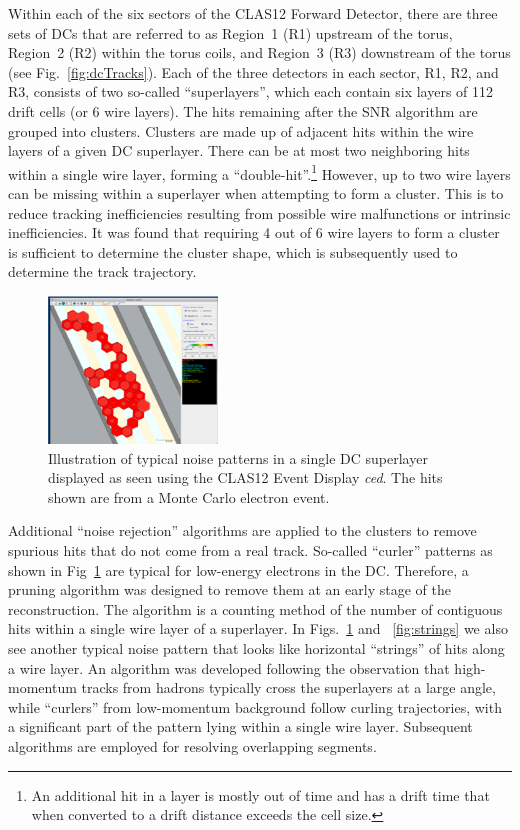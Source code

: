 Within each of the six sectors of the CLAS12 Forward Detector, there are three sets of DCs that are referred to
as Region~1 (R1) upstream of the torus, Region~2 (R2) within the torus coils, and Region~3 (R3) downstream
of the torus (see Fig.~\ref{fig:dcTracks}). Each of the three detectors in each sector, R1, R2, and R3, consists of
two so-called ``superlayers'', which each contain six layers of 112 drift cells (or 6 wire layers). The hits remaining
after the SNR algorithm are grouped into clusters. Clusters are made up of adjacent hits within the wire layers of
a given DC superlayer. There can be at most two neighboring hits within a single wire layer, forming a
``double-hit''.\footnote{An additional hit in a layer is mostly out of time and has a drift time that when converted to a drift
  distance exceeds the cell size.}  However, up to two wire layers can be missing within a superlayer when attempting
to form a cluster.  This is to reduce tracking inefficiencies resulting from possible wire malfunctions or intrinsic
inefficiencies. It was found that requiring 4 out of 6 wire layers to form a cluster is sufficient to determine the
cluster shape, which is subsequently used to determine the track trajectory.

\begin{figure}
\centering
\includegraphics[width=0.4\textwidth]{pics/elooper.png}
\caption{Illustration of typical noise patterns in a single DC superlayer displayed as seen using the CLAS12 Event
  Display {\it ced}. The hits shown are from a Monte Carlo electron event.}
\label{fig:eloop}
\end{figure}

Additional ``noise rejection'' algorithms are applied to the clusters to remove spurious hits that do not come from
a real track. So-called ``curler'' patterns as shown in Fig~\ref{fig:eloop} are typical for low-energy electrons in
the DC.  Therefore, a pruning algorithm was designed to remove them at an early stage of the reconstruction. The
algorithm is a counting method of the number of contiguous hits within a single wire layer of a superlayer.  In
Figs.~\ref{fig:eloop} and ~\ref{fig:strings} we also see another typical noise pattern that looks like horizontal
``strings'' of hits along a wire layer. An algorithm was developed following  the observation that high-momentum
tracks from hadrons typically cross the superlayers at a large angle, while ``curlers'' from low-momentum
background follow curling trajectories, with a significant part of the pattern lying within a single wire layer.
Subsequent algorithms  are employed for resolving overlapping segments.   

